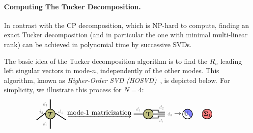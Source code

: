 \paragraph{Computing The Tucker Decomposition.} In contrast with the CP decomposition, which is NP-hard to compute, finding an exact Tucker decomposition (and in particular the one with minimal multi-linear rank) can be achieved in polynomial time by successive SVDs. 

The basic idea of the Tucker decomposition algorithm is to find the $R_n$ leading left singular vectors
in mode-$n$, independently of the other modes. This algorithm, known as \textit{Higher-Order SVD (HOSVD)}~\citep{de2000multilinear}, is depicted below.  For simplicity, we illustrate this process for $N=4$:
\begin{align*}
    &\begin{tikzpicture}[baseline=\baseline]
    \tikzset{tensor/.style = {minimum size = 0.5cm,shape = circle,thick,draw=black,inner sep = 0pt}, edge/.style = {thick,line width=.4mm},every loop/.style={}}
    \def\x{0}
    \def\y{0}
    \node[tensor,fill=green!50!red!50!white] (A) at (\x-5.5,\y){\scalebox{0.85}{$\Tt$}};
    \draw[edge] (A) -- (\x-5.5,\y+0.75) node [midway,left]
    {\scalebox{0.7}{\dimcolor{$d_1$}}};
    \draw[edge] (A) -- (\x-5.5,\y-0.75) node [midway,left]
    {\scalebox{0.7}{\dimcolor{$d_3$}}};
    \draw[edge] (\x-5.75,\y+0.05) -- (\x-6.2,\y-0.3) node [midway,above]
    {\scalebox{0.7}{\dimcolor{$d_2$}}};
    \draw[edge] (\x-5.25,\y+0.05) -- (\x-4.7,\y-0.3) node [midway,above]
    {\scalebox{0.7}{\dimcolor{$d_4$}}};
    \node[draw=none] at (\x-3,\y){$\underrightarrow{\text{mode-1 matricization}}$};
    \node[tensor,fill=green!50!red!50!white] (A) at (\x-0.5,\y){\scalebox{0.85}{$\Tb$}};
    \draw[edge] (\x-0.35,\y+0.2) -- (\x,\y+0.2) --(\x,\y+0.1) -- (\x
    +0.35,\y+0.1) node [midway,above]
    {\scalebox{0.7}{\dimcolor{$d_2$}}};
    \draw[edge] (\x-0.35,\y-0.2) -- (\x,\y-0.2) -- (\x,\y-0.1) -- (\x+0.35,\y-0.1) node [midway,below]
    {\scalebox{0.7}{\dimcolor{$d_4$}}};
     \draw[edge] (A) -- (\x+0.35,\y)node [right]
    {\scalebox{0.7}{\dimcolor{$d_3$}}};
     \draw[edge] (A) -- (\x-1.25,\y) node [midway,above]
    {\scalebox{0.7}{\dimcolor{$d_1$}}};
    \node[draw=none] at (\x+1,\y){$\rightarrow$};
    \node[tensor, path picture={
    \fill[fill=blue!50!white](path picture bounding box.south east)
        -- 
    (path picture bounding box.north west) --
    (path picture bounding box.north east) -- cycle;
    }, shift={(\x+1.5,\y)}] (U_1) {\scalebox{0.8}{$\Ub_1$}};
    \node[tensor,fill=red!50!white] (Sigma_1) at (\x+2.5,\y){\scalebox{0.85}{$\Sigmab_1$}};

\end{tikzpicture}
\end{align*}
